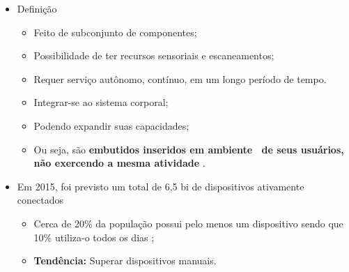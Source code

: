       \begin{frame}{\Wearables} \vspace{-1em}
         \begin{itemize} \setlength{\itemsep}{1.4em}
            \item Definição
            \begin{itemize} \setlength{\itemsep}{0.4em}
               \item Feito de subconjunto de componentes;
               \item Possibilidade de ter recursos sensoriais e escaneamentos;
               \item Requer serviço autônomo, contínuo, em um longo período de tempo.
               \item Integrar-se ao sistema corporal;
               \item Podendo expandir suas capacidades;
               \item Ou seja, são \textbf{embutidos inseridos em ambiente \mobile\ de seus usuários, não exercendo a mesma atividade} \cite{Plessl2003}. 
            \end{itemize}
         
            
            \item Em 2015, foi previsto um total de 6,5 bi de dispositivos ativamente conectados \cite{RobvanderMeulen2015}
            \begin{itemize} \setlength{\itemsep}{0.4em}
               \item Cerca de 20\% da população possui pelo menos um dispositivo sendo que 10\% utiliza-o todos os dias \cite{lee2016information};
               \item \textbf{Tendência:} Superar dispositivos manuais.
            \end{itemize}
            
         \end{itemize}
      \end{frame}  
     
